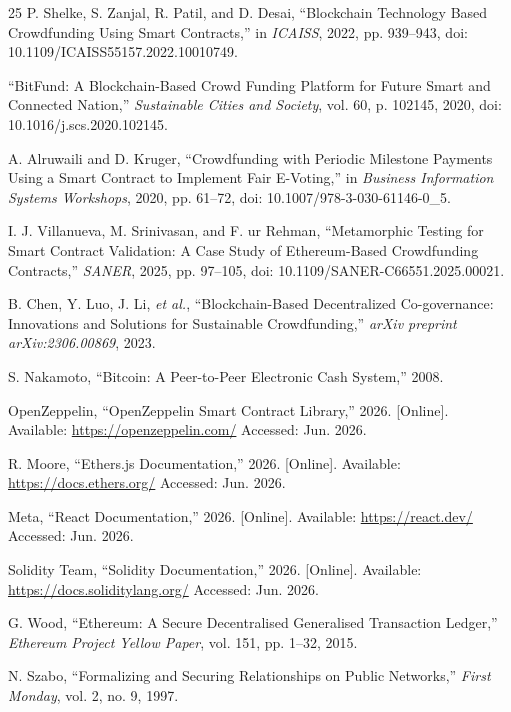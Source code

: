 \documentclass[conference]{IEEEtran}
\begin{document}
\begin{thebibliography}{25}
P. Shelke, S. Zanjal, R. Patil, and D. Desai, ``Blockchain Technology Based Crowdfunding Using Smart Contracts,'' in \textit{ICAISS}, 2022, pp. 939--943, doi: 10.1109/ICAISS55157.2022.10010749.

``BitFund: A Blockchain-Based Crowd Funding Platform for Future Smart and Connected Nation,'' \textit{Sustainable Cities and Society}, vol. 60, p. 102145, 2020, doi: 10.1016/j.scs.2020.102145.

A. Alruwaili and D. Kruger, ``Crowdfunding with Periodic Milestone Payments Using a Smart Contract to Implement Fair E-Voting,'' in \textit{Business Information Systems Workshops}, 2020, pp. 61--72, doi: 10.1007/978-3-030-61146-0\_5.

I. J. Villanueva, M. Srinivasan, and F. ur Rehman, ``Metamorphic Testing for Smart Contract Validation: A Case Study of Ethereum-Based Crowdfunding Contracts,'' \textit{SANER}, 2025, pp. 97--105, doi: 10.1109/SANER-C66551.2025.00021.

B. Chen, Y. Luo, J. Li, \textit{et al.}, ``Blockchain-Based Decentralized Co-governance: Innovations and Solutions for Sustainable Crowdfunding,'' \textit{arXiv preprint arXiv:2306.00869}, 2023.

S. Nakamoto, ``Bitcoin: A Peer-to-Peer Electronic Cash System,'' 2008.

OpenZeppelin, ``OpenZeppelin Smart Contract Library,'' 2026. [Online]. Available: \url{https://openzeppelin.com/} Accessed: Jun. 2026.

R. Moore, ``Ethers.js Documentation,'' 2026. [Online]. Available: \url{https://docs.ethers.org/} Accessed: Jun. 2026.

Meta, ``React Documentation,'' 2026. [Online]. Available: \url{https://react.dev/} Accessed: Jun. 2026.

Solidity Team, ``Solidity Documentation,'' 2026. [Online]. Available: \url{https://docs.soliditylang.org/} Accessed: Jun. 2026.

G. Wood, ``Ethereum: A Secure Decentralised Generalised Transaction Ledger,'' \textit{Ethereum Project Yellow Paper}, vol. 151, pp. 1--32, 2015.

N. Szabo, ``Formalizing and Securing Relationships on Public Networks,'' \textit{First Monday}, vol. 2, no. 9, 1997.


\end{thebibliography}
\end{document}
